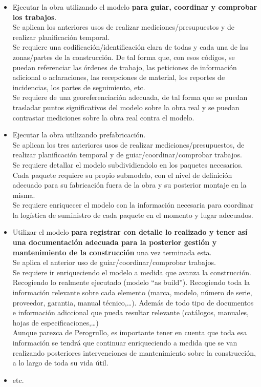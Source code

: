 \documentclass[spanish,12pt,a4paper,final,oneside]{book}
\begin{document}
\begin{itemize}
\item Ejecutar la obra utilizando el modelo \textbf{para guiar, coordinar y comprobar los trabajos}.
\\Se aplican los anteriores usos de realizar mediciones/presupuestos y de realizar planificación temporal.
\\Se requiere una codificación/identificación clara de todas y cada una de las zonas/partes de la construcción. De tal forma que, con esos códigos, se puedan referenciar las órdenes de trabajo, las peticiones de información adicional o aclaraciones, las recepciones de material, los reportes de incidencias, los partes de seguimiento, etc.
\\Se requiere de una georeferenciación adecuada, de tal forma que se puedan trasladar puntos significativos del modelo sobre la obra real y se puedan contrastar mediciones sobre la obra real contra el modelo.

\item Ejecutar la obra utilizando prefabricación.
\\Se aplican los tres anteriores usos de realizar mediciones/presupuestos, de realizar planificación temporal y de guiar/coordinar/comprobar trabajos.
\\Se requiere detallar el modelo subdividiendolo en los paquetes necesarios.
\\Cada paquete requiere su propio submodelo, con el nivel de definición adecuado para su fabricación fuera de la obra y su posterior montaje en la misma.
\\Se requiere enriquecer el modelo con la información necesaria para coordinar la logística de suministro de cada paquete en el momento y lugar adecuados.

\item Utilizar el modelo \textbf{para registrar con detalle lo realizado y tener así una documentación adecuada para la posterior gestión y mantenimiento de la construcción} una vez terminada esta.
\\Se aplica el anterior uso de guiar/coordinar/comprobar trabajos.
\\Se requiere ir enriqueciendo el modelo a medida que avanza la construcción. Recogiendo lo realmente ejecutado (modelo “as build”). Recogiendo toda la información relevante sobre cada elemento (marca, modelo, número de serie, proveedor, garantia, manual técnico,\ldots). Además de todo tipo de documentos e información adiccional que pueda resultar relevante (catálogos, manuales, hojas de especificaciones,\ldots)
\\Aunque parezca de Perogrullo, es importante tener en cuenta que toda esa información se tendrá que continuar enriqueciendo a medida que se van realizando posteriores intervenciones de mantenimiento sobre la construcción, a lo largo de toda su vida útil. 

\item etc.

\end{itemize}
\end{document}
